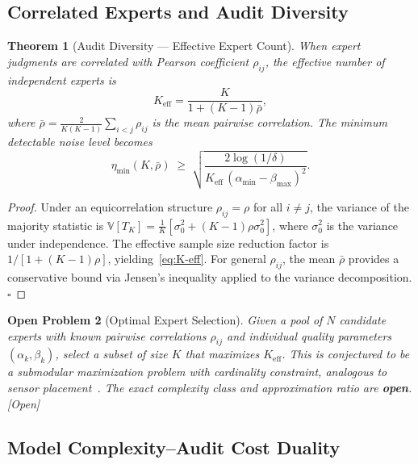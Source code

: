 \documentclass[12pt,a4paper]{article}
\newtheorem{theorem}{Theorem}[section]
\newtheorem{openproblem}[theorem]{Open Problem}
\newcommand{\openquest}{\textcolor{red!70!black}{\small\textsf{[Open]}}}
\newcommand{\V}{\mathbb{V}}
\begin{document}
\subsection{Correlated Experts and Audit Diversity}
\label{sec:diversity}

\begin{theorem}[Audit Diversity — Effective Expert Count]
\label{thm:diversity}
When expert judgments are correlated with Pearson coefficient $\rho_{ij}$,
the effective number of independent experts is
\begin{equation}\label{eq:K-eff}
    K_{\mathrm{eff}} = \frac{K}{1 + (K-1)\bar{\rho}},
\end{equation}
where $\bar{\rho} = \frac{2}{K(K-1)}\sum_{i<j}\rho_{ij}$ is the mean
pairwise correlation.  The minimum detectable noise level becomes
\begin{equation}\label{eq:eta-min-corr}
    \eta_{\min}(K,\bar{\rho}) \;\geq\;
    \sqrt{\frac{2\log(1/\delta)}
               {K_{\mathrm{eff}}\,(\alpha_{\min}-\beta_{\max})^2}}.
\end{equation}
\end{theorem}

\begin{proof}
Under an equicorrelation structure $\rho_{ij}=\rho$ for all $i\neq j$, the
variance of the majority statistic is
$\V[T_K] = \frac{1}{K}[\sigma_0^2 + (K-1)\rho\sigma_0^2]$, where $\sigma_0^2$
is the variance under independence.  The effective sample size reduction factor
is $1/[1+(K-1)\rho]$, yielding~\eqref{eq:K-eff}.  For general $\rho_{ij}$,
the mean $\bar{\rho}$ provides a conservative bound via Jensen's inequality
applied to the variance decomposition. $\square$
\end{proof}

\begin{openproblem}[Optimal Expert Selection]
\label{prob:expert-selection}
Given a pool of $N$ candidate experts with known pairwise correlations
$\rho_{ij}$ and individual quality parameters $(\alpha_k,\beta_k)$, select a
subset of size $K$ that maximizes $K_{\mathrm{eff}}$.  This is conjectured
to be a submodular maximization problem with cardinality constraint, analogous
to sensor placement~\citep{krause2008near}.  The exact complexity class and
approximation ratio are \textbf{open}.  \openquest
\end{openproblem}

\subsection{Model Complexity--Audit Cost Duality}
\end{document}
